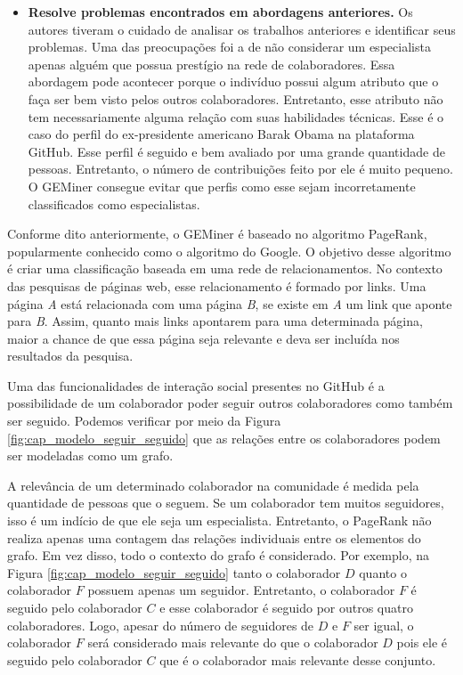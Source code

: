 \begin{itemize}
\item \textbf{Resolve problemas encontrados em abordagens anteriores.} Os autores tiveram o cuidado de analisar os trabalhos anteriores e identificar seus problemas. Uma das preocupações foi a de não considerar um especialista apenas alguém que possua prestígio na rede de colaboradores. Essa abordagem pode acontecer porque o indivíduo possui algum atributo que o faça ser bem visto pelos outros colaboradores. Entretanto, esse atributo não tem necessariamente alguma relação com suas habilidades técnicas. Esse é o caso do perfil do ex-presidente americano Barak Obama na plataforma GitHub. Esse perfil é seguido e bem avaliado por uma grande quantidade de pessoas. Entretanto, o número de contribuições feito por ele é muito pequeno. O GEMiner consegue evitar que perfis como esse sejam incorretamente classificados como especialistas.
\end{itemize}


Conforme dito anteriormente, o GEMiner é baseado no algoritmo PageRank, popularmente conhecido como o algoritmo do Google. O objetivo desse algoritmo é criar uma classificação baseada em uma rede de relacionamentos. No contexto das pesquisas de páginas web, esse relacionamento é formado por links. Uma página \textit{A} está relacionada com uma página \textit{B}, se existe em \textit{A} um link que aponte para \textit{B}. Assim, quanto mais links apontarem para uma determinada página, maior a  chance de que essa página seja relevante e deva ser incluída nos resultados da pesquisa.  

Uma das funcionalidades de interação social presentes no GitHub é  a possibilidade de um colaborador poder seguir outros colaboradores como também ser seguido.  Podemos verificar por meio da Figura \ref{fig:cap_modelo_seguir_seguido} que as relações entre os colaboradores podem ser modeladas como um grafo.

 A relevância de um determinado colaborador na comunidade é medida pela quantidade de pessoas que o seguem. Se um colaborador tem muitos seguidores, isso é um indício de que ele seja um especialista. Entretanto, o PageRank não realiza apenas uma contagem das relações individuais entre os elementos do grafo. Em vez disso, todo o contexto do grafo é considerado. Por exemplo, na Figura \ref{fig:cap_modelo_seguir_seguido} tanto o colaborador $D$ quanto o colaborador $F$ possuem apenas um seguidor. Entretanto, o colaborador $F$ é seguido pelo colaborador $C$ e esse colaborador é seguido por outros quatro colaboradores. Logo, apesar do número de seguidores de $D$ e $F$ ser igual,  o colaborador $F$ será considerado mais relevante do que o colaborador $D$ pois ele é seguido pelo colaborador  $C$ que é o colaborador mais relevante desse conjunto. 

